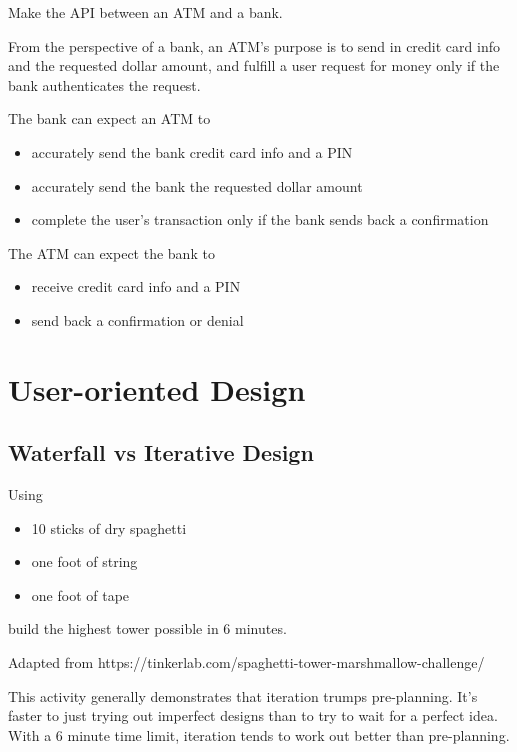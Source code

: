 \begin{example}
Make the API between an ATM and a bank.
\end{example}

From the perspective of a bank, an ATM's purpose is to send in credit card info and the requested dollar amount, and fulfill a user request for money only if the bank authenticates the request. 

The bank can expect an ATM to
\begin{itemize}
	\item accurately send the bank credit card info and a PIN
	\item accurately send the bank the requested dollar amount
	\item complete the user's transaction only if the bank sends back a confirmation
\end{itemize}

The ATM can expect the bank to
\begin{itemize}
	\item receive credit card info and a PIN
	\item send back a confirmation or denial 
\end{itemize}

\section{User-oriented Design}

\subsection{Waterfall vs Iterative Design}

\begin{example}
Using 
\begin{itemize}
	\item 10 sticks of dry spaghetti
	\item one foot of string
	\item one foot of tape
\end{itemize}

build the highest tower possible in 6 minutes.

Adapted from https://tinkerlab.com/spaghetti-tower-marshmallow-challenge/
\end{example}

This activity generally demonstrates that iteration trumps pre-planning. It's faster to just trying out imperfect designs than to try to wait for a perfect idea. With a 6 minute time limit, iteration tends to work out better than pre-planning. 

